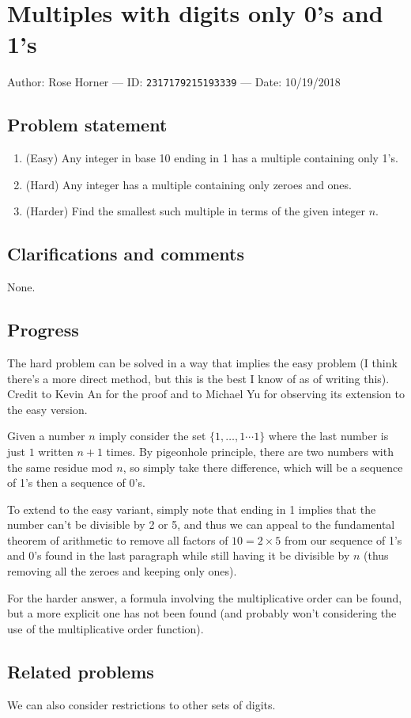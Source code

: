 
\section{Multiples with digits only 0's and 1's}

Author: Rose Horner --- ID: \verb`2317179215193339` --- Date: 10/19/2018

\subsection{Problem statement}

\begin{enumerate}
    \item (Easy) Any integer in base 10 ending in 1 has a multiple containing only 1's.
    \item (Hard) Any integer has a multiple containing only zeroes and ones.
    \item (Harder) Find the smallest such multiple in terms of the given integer $n$.
\end{enumerate}

\subsection{Clarifications and comments}

None.

\subsection{Progress}

The hard problem can be solved in a way that implies the easy problem (I think there's a more direct method, but this is the best I know of as of writing this). Credit to Kevin An for the proof and to Michael Yu for observing its extension to the easy version.

Given a number $n$ imply consider the set $\{1,\ldots,1\cdots 1\}$ where the last number is just $1$ written $n+1$ times. By pigeonhole principle, there are two numbers with the same residue mod $n$, so simply take there difference, which will be a sequence of 1's then a sequence of 0's.

To extend to the easy variant, simply note that ending in 1 implies that the number can't be divisible by 2 or 5, and thus we can appeal to the fundamental theorem of arithmetic to remove all factors of $10=2\times 5$ from our sequence of 1's and 0's found in the last paragraph while still having it be divisible by $n$ (thus removing all the zeroes and keeping only ones).

For the harder answer, a formula involving the multiplicative order can be found, but a more explicit one has not been found (and probably won't considering the use of the multiplicative order function).

\subsection{Related problems}

We can also consider restrictions to other sets of digits.

